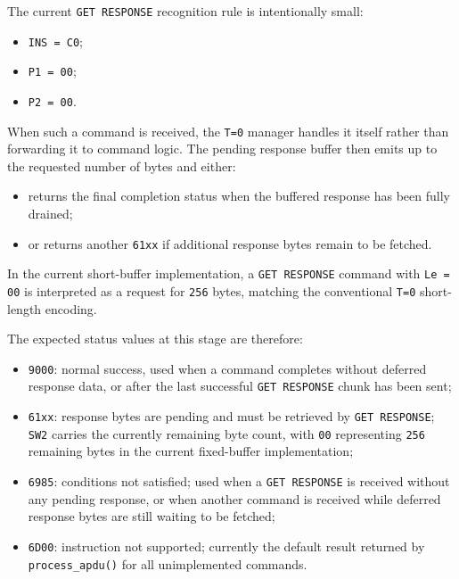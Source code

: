 The current \texttt{GET RESPONSE} recognition rule is intentionally
small:

\begin{itemize}
\item \texttt{INS = C0};
\item \texttt{P1 = 00};
\item \texttt{P2 = 00}.
\end{itemize}

When such a command is received, the \texttt{T=0} manager handles it
itself rather than forwarding it to command logic. The
pending response buffer then emits up to the requested number of bytes
and either:

\begin{itemize}
\item returns the final completion status when the buffered response has
  been fully drained;
\item or returns another \texttt{61xx} if additional response bytes
  remain to be fetched.
\end{itemize}

In the current short-buffer implementation, a \texttt{GET RESPONSE}
command with \texttt{Le = 00} is interpreted as a request for
\texttt{256} bytes, matching the conventional \texttt{T=0} short-length
encoding.

The expected status values at this stage are therefore:

\begin{itemize}
\item \texttt{9000}: normal success, used when a command completes
  without deferred response data, or after the last successful
  \texttt{GET RESPONSE} chunk has been sent;
\item \texttt{61xx}: response bytes are pending and must be retrieved by
  \texttt{GET RESPONSE}; \texttt{SW2} carries the currently remaining
  byte count, with \texttt{00} representing \texttt{256} remaining
  bytes in the current fixed-buffer implementation;
\item \texttt{6985}: conditions not satisfied; used when a
  \texttt{GET RESPONSE} is received without any pending response, or
  when another command is received while deferred response bytes are
  still waiting to be fetched;
\item \texttt{6D00}: instruction not supported; currently the default
  result returned by \texttt{process\_apdu()} for all unimplemented
  commands.
\end{itemize}

